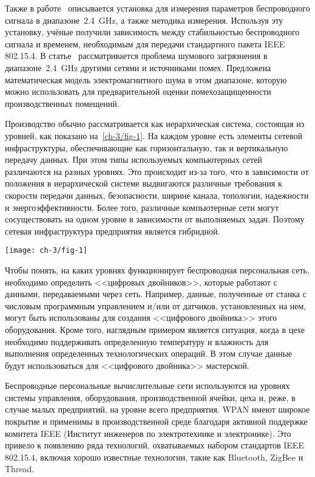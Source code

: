 Также в работе~\cite{Girs2013DesignOC} описывается установка для измерения параметров беспроводного сигнала в диапазоне~\SI{2,4}{\giga\hertz}, а также методика измерения. Используя эту установку, учёные получили зависимость между стабильностью беспроводного сигнала и временем, необходимым для передачи стандартного пакета IEEE 802.15.4. В статье~\cite{8308609} рассматривается проблема шумового загрязнения в диапазоне~\SI{2,4}{\giga\hertz} другими сетями и источниками помех. Предложена математическая модель электромагнитного шума в этом диапазоне, которую можно использовать для предварительной оценки помехозащищенности производственных помещений.

Производство обычно рассматривается как иерархическая система, состоящая из уровней, как показано на~\cref{ch-3/fig-1}. На каждом уровне есть элементы сетевой инфраструктуры, обеспечивающие как горизонтальную, так и вертикальную передачу данных.
При этом типы используемых компьютерных сетей различаются на разных уровнях. Это происходит из-за того, что в зависимости от положения в иерархической системе выдвигаются различные требования к скорости передачи данных, безопасности, ширине канала, топологии, надежности и энергоэффективности. Более того, различные компьютерные сети могут сосуществовать на одном уровне в зависимости от выполняемых задач. Поэтому сетевая инфраструктура предприятия является гибридной.

\begin{figure*} [tb]
	\centering
	\texttt{[image: ch-3/fig-1]}
	\caption{Уровни производственной системы}
	\label{ch-3/fig-1}
\end{figure*}

Чтобы понять, на каких уровнях функционирует беспроводная персональная сеть, необходимо определить <<цифровых двойников>>, которые работают с данными, передаваемыми через сеть. Например, данные, полученные от станка с числовым программным управлением и/или от датчиков, установленных на нем, могут быть использованы для создания <<цифрового двойника>> этого оборудования. Кроме того, наглядным примером является ситуация, когда в цехе необходимо поддерживать определенную температуру и влажность для выполнения определенных технологических операций. В этом случае данные будут использоваться для <<цифрового двойника>> мастерской.

Беспроводные персональные вычислительные сети используются на уровнях системы управления, оборудования, производственной ячейки, цеха и, реже, в случае малых предприятий, на уровне всего предприятия. WPAN имеют широкое покрытие и применимы в производственной среде благодаря активной поддержке комитета IEEE (Институт инженеров по электротехнике и электронике). Это привело к появлению ряда технологий, охватываемых набором стандартов IEEE 802.15.4, включая хорошо известные технологии, такие как Bluetooth, ZigBee и Thread.

